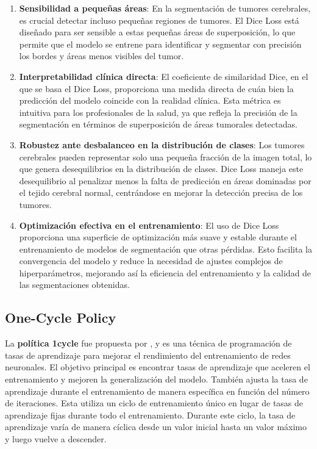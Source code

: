 \begin{enumerate}
	\item \textbf{Sensibilidad a pequeñas áreas}: En la segmentación de tumores cerebrales, es crucial detectar incluso pequeñas regiones de tumores. El Dice Loss está diseñado para ser sensible a estas pequeñas áreas de superposición, lo que permite que el modelo se entrene para identificar y segmentar con precisión los bordes y áreas menos visibles del tumor.
	
	\item \textbf{Interpretabilidad clínica directa}: El coeficiente de similaridad Dice, en el que se basa el Dice Loss, proporciona una medida directa de cuán bien la predicción del modelo coincide con la realidad clínica. Esta métrica es intuitiva para los profesionales de la salud, ya que refleja la precisión de la segmentación en términos de superposición de áreas tumorales detectadas.
	
	\item \textbf{Robustez ante desbalanceo en la distribución de clases}: Los tumores cerebrales pueden representar solo una pequeña fracción de la imagen total, lo que genera desequilibrios en la distribución de clases. Dice Loss maneja este desequilibrio al penalizar menos la falta de predicción en áreas dominadas por el tejido cerebral normal, centrándose en mejorar la detección precisa de los tumores.
	
	\item \textbf{Optimización efectiva en el entrenamiento}: El uso de Dice Loss proporciona una superficie de optimización más suave y estable durante el entrenamiento de modelos de segmentación que otras pérdidas. Esto facilita la convergencia del modelo y reduce la necesidad de ajustes complejos de hiperparámetros, mejorando así la eficiencia del entrenamiento y la calidad de las segmentaciones obtenidas.
\end{enumerate}


\subsection{One-Cycle Policy}

La \textbf{política 1cycle} fue propuesta por \cite{smith2019super}, y es una técnica de programación de tasas de aprendizaje para mejorar el rendimiento del entrenamiento de redes neuronales. El objetivo principal es encontrar tasas de aprendizaje que aceleren el entrenamiento y mejoren la generalización del modelo. También ajusta la tasa de aprendizaje durante el entrenamiento de manera específica en función del número de iteraciones. Esta utiliza un ciclo de entrenamiento único en lugar de tasas de aprendizaje fijas durante todo el entrenamiento. Durante este ciclo, la tasa de aprendizaje varía de manera cíclica desde un valor inicial hasta un valor máximo y luego vuelve a descender.

